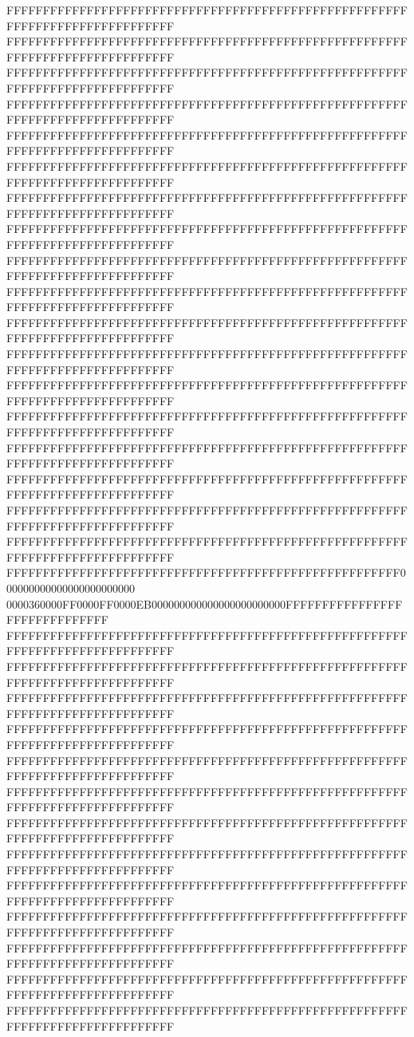 FFFFFFFFFFFFFFFFFFFFFFFFFFFFFFFFFFFFFFFFFFFFFFFFFFFFFFFFFFFFFFFFFFFFFFFFFFFFFF
FFFFFFFFFFFFFFFFFFFFFFFFFFFFFFFFFFFFFFFFFFFFFFFFFFFFFFFFFFFFFFFFFFFFFFFFFFFFFF
FFFFFFFFFFFFFFFFFFFFFFFFFFFFFFFFFFFFFFFFFFFFFFFFFFFFFFFFFFFFFFFFFFFFFFFFFFFFFF
FFFFFFFFFFFFFFFFFFFFFFFFFFFFFFFFFFFFFFFFFFFFFFFFFFFFFFFFFFFFFFFFFFFFFFFFFFFFFF
FFFFFFFFFFFFFFFFFFFFFFFFFFFFFFFFFFFFFFFFFFFFFFFFFFFFFFFFFFFFFFFFFFFFFFFFFFFFFF
FFFFFFFFFFFFFFFFFFFFFFFFFFFFFFFFFFFFFFFFFFFFFFFFFFFFFFFFFFFFFFFFFFFFFFFFFFFFFF
FFFFFFFFFFFFFFFFFFFFFFFFFFFFFFFFFFFFFFFFFFFFFFFFFFFFFFFFFFFFFFFFFFFFFFFFFFFFFF
FFFFFFFFFFFFFFFFFFFFFFFFFFFFFFFFFFFFFFFFFFFFFFFFFFFFFFFFFFFFFFFFFFFFFFFFFFFFFF
FFFFFFFFFFFFFFFFFFFFFFFFFFFFFFFFFFFFFFFFFFFFFFFFFFFFFFFFFFFFFFFFFFFFFFFFFFFFFF
FFFFFFFFFFFFFFFFFFFFFFFFFFFFFFFFFFFFFFFFFFFFFFFFFFFFFFFFFFFFFFFFFFFFFFFFFFFFFF
FFFFFFFFFFFFFFFFFFFFFFFFFFFFFFFFFFFFFFFFFFFFFFFFFFFFFFFFFFFFFFFFFFFFFFFFFFFFFF
FFFFFFFFFFFFFFFFFFFFFFFFFFFFFFFFFFFFFFFFFFFFFFFFFFFFFFFFFFFFFFFFFFFFFFFFFFFFFF
FFFFFFFFFFFFFFFFFFFFFFFFFFFFFFFFFFFFFFFFFFFFFFFFFFFFFFFFFFFFFFFFFFFFFFFFFFFFFF
FFFFFFFFFFFFFFFFFFFFFFFFFFFFFFFFFFFFFFFFFFFFFFFFFFFFFFFFFFFFFFFFFFFFFFFFFFFFFF
FFFFFFFFFFFFFFFFFFFFFFFFFFFFFFFFFFFFFFFFFFFFFFFFFFFFFFFFFFFFFFFFFFFFFFFFFFFFFF
FFFFFFFFFFFFFFFFFFFFFFFFFFFFFFFFFFFFFFFFFFFFFFFFFFFFFFFFFFFFFFFFFFFFFFFFFFFFFF
FFFFFFFFFFFFFFFFFFFFFFFFFFFFFFFFFFFFFFFFFFFFFFFFFFFFFFFFFFFFFFFFFFFFFFFFFFFFFF
FFFFFFFFFFFFFFFFFFFFFFFFFFFFFFFFFFFFFFFFFFFFFFFFFFFFFFFFFFFFFFFFFFFFFFFFFFFFFF
FFFFFFFFFFFFFFFFFFFFFFFFFFFFFFFFFFFFFFFFFFFFFFFFFFFFFF000000000000000000000000
0000360000FF0000FF0000EB000000000000000000000000FFFFFFFFFFFFFFFFFFFFFFFFFFFFFF
FFFFFFFFFFFFFFFFFFFFFFFFFFFFFFFFFFFFFFFFFFFFFFFFFFFFFFFFFFFFFFFFFFFFFFFFFFFFFF
FFFFFFFFFFFFFFFFFFFFFFFFFFFFFFFFFFFFFFFFFFFFFFFFFFFFFFFFFFFFFFFFFFFFFFFFFFFFFF
FFFFFFFFFFFFFFFFFFFFFFFFFFFFFFFFFFFFFFFFFFFFFFFFFFFFFFFFFFFFFFFFFFFFFFFFFFFFFF
FFFFFFFFFFFFFFFFFFFFFFFFFFFFFFFFFFFFFFFFFFFFFFFFFFFFFFFFFFFFFFFFFFFFFFFFFFFFFF
FFFFFFFFFFFFFFFFFFFFFFFFFFFFFFFFFFFFFFFFFFFFFFFFFFFFFFFFFFFFFFFFFFFFFFFFFFFFFF
FFFFFFFFFFFFFFFFFFFFFFFFFFFFFFFFFFFFFFFFFFFFFFFFFFFFFFFFFFFFFFFFFFFFFFFFFFFFFF
FFFFFFFFFFFFFFFFFFFFFFFFFFFFFFFFFFFFFFFFFFFFFFFFFFFFFFFFFFFFFFFFFFFFFFFFFFFFFF
FFFFFFFFFFFFFFFFFFFFFFFFFFFFFFFFFFFFFFFFFFFFFFFFFFFFFFFFFFFFFFFFFFFFFFFFFFFFFF
FFFFFFFFFFFFFFFFFFFFFFFFFFFFFFFFFFFFFFFFFFFFFFFFFFFFFFFFFFFFFFFFFFFFFFFFFFFFFF
FFFFFFFFFFFFFFFFFFFFFFFFFFFFFFFFFFFFFFFFFFFFFFFFFFFFFFFFFFFFFFFFFFFFFFFFFFFFFF
FFFFFFFFFFFFFFFFFFFFFFFFFFFFFFFFFFFFFFFFFFFFFFFFFFFFFFFFFFFFFFFFFFFFFFFFFFFFFF
FFFFFFFFFFFFFFFFFFFFFFFFFFFFFFFFFFFFFFFFFFFFFFFFFFFFFFFFFFFFFFFFFFFFFFFFFFFFFF
FFFFFFFFFFFFFFFFFFFFFFFFFFFFFFFFFFFFFFFFFFFFFFFFFFFFFFFFFFFFFFFFFFFFFFFFFFFFFF
